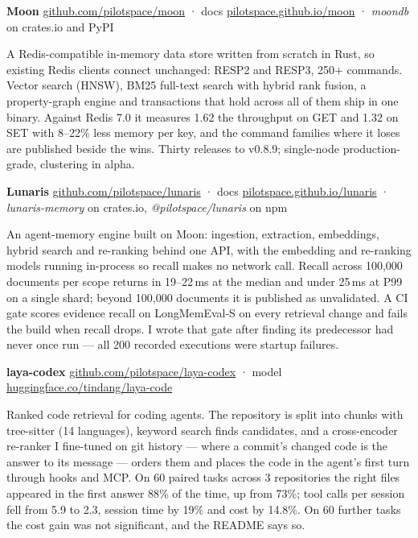 \documentclass[10pt,a4paper,ragged2e,withhyper]{altacv}
\newcommand{\work}[3]{\par\vspace{7pt}\noindent\textbf{\textcolor{accent}{#1}} \textcolor{accent}{\textbullet} {\footnotesize #2}\par\nobreak\vspace{1pt}\noindent #3\par}
\begin{document}
\work{Moon}{\href{https://github.com/pilotspace/moon}{github.com/pilotspace/moon} · docs \href{https://pilotspace.github.io/moon/}{pilotspace.github.io/moon} · \textit{moondb} on crates.io and PyPI}{A Redis-compatible in-memory data store written from scratch in Rust, so existing Redis clients connect unchanged: RESP2 and RESP3, 250+ commands. Vector search (HNSW), BM25 full-text search with hybrid rank fusion, a property-graph engine and transactions that hold across all of them ship in one binary. Against Redis 7.0 it measures 1.62\texttimes{} the throughput on GET and 1.32\texttimes{} on SET with 8--22\% less memory per key, and the command families where it loses are published beside the wins. Thirty releases to v0.8.9; single-node production-grade, clustering in alpha.}

\work{Lunaris}{\href{https://github.com/pilotspace/lunaris}{github.com/pilotspace/lunaris} · docs \href{https://pilotspace.github.io/lunaris/}{pilotspace.github.io/lunaris} · \textit{lunaris-memory} on crates.io, \textit{@pilotspace/lunaris} on npm}{An agent-memory engine built on Moon: ingestion, extraction, embeddings, hybrid search and re-ranking behind one API, with the embedding and re-ranking models running in-process so recall makes no network call. Recall across 100,000 documents per scope returns in 19--22\,ms at the median and under 25\,ms at P99 on a single shard; beyond 100,000 documents it is published as unvalidated. A CI gate scores evidence recall on LongMemEval-S on every retrieval change and fails the build when recall drops. I wrote that gate after finding its predecessor had never once run --- all 200 recorded executions were startup failures.}

\work{laya-codex}{\href{https://github.com/pilotspace/laya-codex}{github.com/pilotspace/laya-codex} · model \href{https://huggingface.co/tindang/laya-code}{huggingface.co/tindang/laya-code}}{Ranked code retrieval for coding agents. The repository is split into chunks with tree-sitter (14 languages), keyword search finds candidates, and a cross-encoder re-ranker I fine-tuned on git history --- where a commit's changed code is the answer to its message --- orders them and places the code in the agent's first turn through hooks and MCP. On 60 paired tasks across 3 repositories the right files appeared in the first answer 88\% of the time, up from 73\%; tool calls per session fell from 5.9 to 2.3, session time by 19\% and cost by 14.8\%. On 60 further tasks the cost gain was not significant, and the README says so.}
\end{document}
